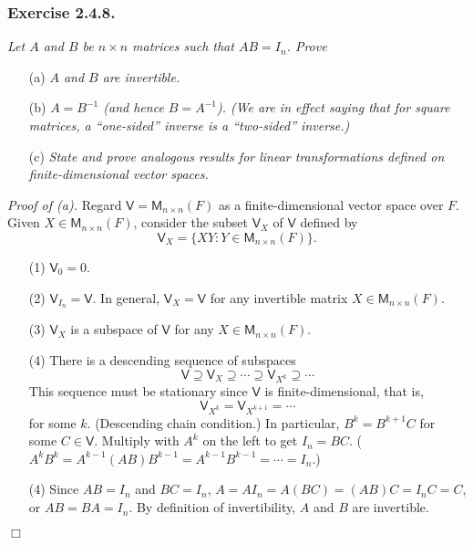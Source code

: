 \documentclass{article}
\begin{document}
\subsubsection*{Exercise 2.4.8.}
\emph{Let $A$ and $B$ be $n \times n$ matrices such that $AB = I_n$.
Prove}
\begin{enumerate}
\item[(a)]
\emph{$A$ and $B$ are invertible.}
\item[(b)]
\emph{$A = B^{-1}$ (and hence $B = A^{-1}$).
(We are in effect saying that for square matrices,
a ``one-sided'' inverse is a ``two-sided'' inverse.)}
\item[(c)]
\emph{State and prove analogous results for linear transformations
defined on finite-dimensional vector spaces.} \\
\end{enumerate}

\emph{Proof of (a).}
Regard $\mathsf{V} = \mathsf{M}_{n \times n}(F)$ as a finite-dimensional vector space over $F$.
Given $X \in \mathsf{M}_{n \times n}(F)$,
consider the subset $\mathsf{V}_X$ of $\mathsf{V}$ defined by
$$\mathsf{V}_X = \{ XY : Y \in \mathsf{M}_{n \times n}(F) \}.$$
\begin{enumerate}
\item[(1)]
$\mathsf{V}_0 = 0$.
\item[(2)]
$\mathsf{V}_{I_n} = \mathsf{V}$.
In general,
$\mathsf{V}_X = \mathsf{V}$ for any invertible matrix $X \in \mathsf{M}_{n \times n}(F)$.
\item[(3)]
$\mathsf{V}_X$ is a subspace of $\mathsf{V}$ for any $X \in \mathsf{M}_{n \times n}(F)$.
\item[(4)]
There is a descending sequence of subspaces
$$\mathsf{V}
  \supseteq \mathsf{V}_X
  \supseteq \cdots
  \supseteq \mathsf{V}_{X^k}
  \supseteq \cdots
$$
This sequence must be stationary since $\mathsf{V}$ is finite-dimensional,
that is,
$$\mathsf{V}_{X^k} = \mathsf{V}_{X^{k+1}} = \cdots$$ for some $k$.
(Descending chain condition.)
In particular, $B^k = B^{k+1}C$ for some $C \in \mathsf{V}$.
Multiply with $A^k$ on the left to get $I_n = BC$.
($A^k B^k = A^{k-1}(AB)B^{k-1} = A^{k-1}B^{k-1} = \cdots = I_n$.)
\item[(4)]
Since $AB = I_n$ and $BC  = I_n$,
$A = AI_n = A(BC) = (AB)C = I_nC = C$,
or $AB = BA = I_n$.
By definition of invertibility, $A$ and $B$ are invertible.
\end{enumerate}
$\Box$ \\
\end{document}
